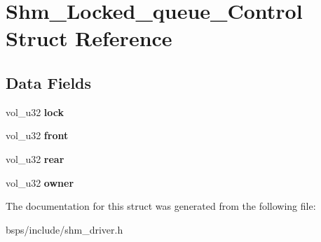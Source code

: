 \hypertarget{structShm__Locked__queue__Control}{}\section{Shm\+\_\+\+Locked\+\_\+queue\+\_\+\+Control Struct Reference}
\label{structShm__Locked__queue__Control}
\subsection*{Data Fields}
\begin{DoxyCompactItemize}
\item 
\mbox{\label{structShm__Locked__queue__Control_a086ed45ce6d106b12e9f99036bee1305}} 
vol\+\_\+u32 {\bfseries lock}
\item 
\mbox{\label{structShm__Locked__queue__Control_a1b033cacb66d180a3b15bb41b8774d2e}} 
vol\+\_\+u32 {\bfseries front}
\item 
\mbox{\label{structShm__Locked__queue__Control_a4ab7bb4fd8345d1760aaf0f3494be981}} 
vol\+\_\+u32 {\bfseries rear}
\item 
\mbox{\label{structShm__Locked__queue__Control_a9d8b759833134ce95644edfab15ad3e1}} 
vol\+\_\+u32 {\bfseries owner}
\end{DoxyCompactItemize}


The documentation for this struct was generated from the following file\+:\begin{DoxyCompactItemize}
\item 
bsps/include/shm\+\_\+driver.\+h\end{DoxyCompactItemize}
